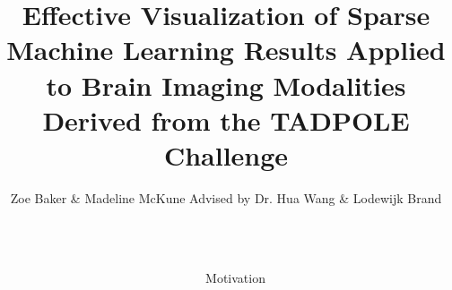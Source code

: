 \documentclass[final]{beamer}
\title{Effective Visualization of Sparse Machine Learning Results Applied to Brain Imaging Modalities Derived from the TADPOLE Challenge \\[0.5in]} %
\author{Zoe Baker \& Madeline McKune  Advised by Dr. Hua Wang \& Lodewijk Brand} %
\institute{Computer Science Department\\Colorado School of Mines} %
\newlength{\sepwid}
\newlength{\onecolwid}
\begin{document}
    
    
    \setlength{\belowcaptionskip}{2ex} %
    \setlength\belowdisplayshortskip{2ex} %
    
    \begin{frame}[t] %
    
    \begin{columns}[t] %
    
    \begin{column}{\sepwid}\end{column} %
    
    \begin{column}{\onecolwid} %
    
        

        \begin{alertblock}{Motivation}
        

\end{alertblock}
\end{column}
\end{columns}
\end{frame}
\end{document}
